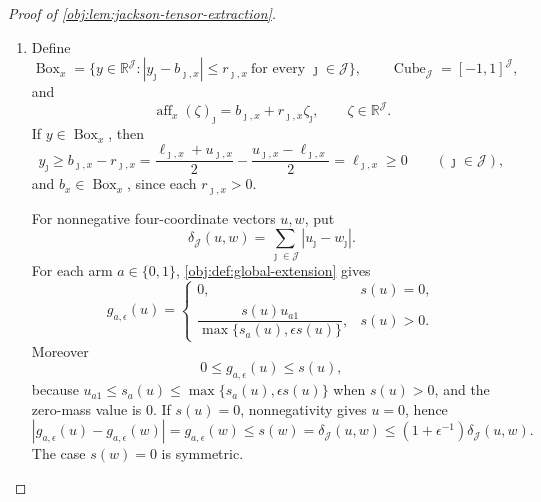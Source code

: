 \begin{proof}[Proof of \cref{obj:lem:jackson-tensor-extraction}]
\begin{enumerate}
\item Define
\[
\operatorname{Box}_x
=
\{y\in\mathbb R^{\mathcal J}: |y_\jmath-b_{\jmath,x}|\le r_{\jmath,x}
\ \text{for every }\jmath\in\mathcal J\},
\qquad
\operatorname{Cube}_{\mathcal J}=[-1,1]^{\mathcal J},
\]
and
\[
\operatorname{aff}_x(\zeta)_\jmath
=
b_{\jmath,x}+r_{\jmath,x}\zeta_\jmath,
\qquad
\zeta\in\mathbb R^{\mathcal J}.
\]
If \(y\in\operatorname{Box}_x\), then
\[
y_\jmath\ge b_{\jmath,x}-r_{\jmath,x}
=
\frac{\ell_{\jmath,x}+u_{\jmath,x}}2
-
\frac{u_{\jmath,x}-\ell_{\jmath,x}}2
=
\ell_{\jmath,x}\ge0
\qquad(\jmath\in\mathcal J),
\]
and \(b_x\in\operatorname{Box}_x\), since each \(r_{\jmath,x}>0\).

For nonnegative four-coordinate vectors \(u,w\), put
\[
\delta_{\mathcal J}(u,w)
=
\sum_{\jmath\in\mathcal J}|u_\jmath-w_\jmath|.
\]
For each arm \(a\in\{0,1\}\), \cref{obj:def:global-extension} gives
\[
g_{a,\epsilon}(u)
=
\begin{cases}
0, & s(u)=0,\\[2mm]
\dfrac{s(u)u_{a1}}{\max\{s_a(u),\epsilon s(u)\}}, & s(u)>0.
\end{cases}
\]
Moreover
\[
0\le g_{a,\epsilon}(u)\le s(u),
\]
because \(u_{a1}\le s_a(u)\le \max\{s_a(u),\epsilon s(u)\}\) when \(s(u)>0\), and the zero-mass value is \(0\). If \(s(u)=0\), nonnegativity gives \(u=0\), hence
\[
|g_{a,\epsilon}(u)-g_{a,\epsilon}(w)|
=
g_{a,\epsilon}(w)
\le s(w)
=
\delta_{\mathcal J}(u,w)
\le (1+\epsilon^{-1})\delta_{\mathcal J}(u,w).
\]
The case \(s(w)=0\) is symmetric.


\end{enumerate}
\end{proof}

